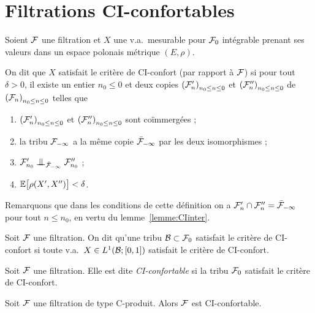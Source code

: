 \documentclass[12pt,a4paper]{article}
\begin{document}
\section{Filtrations CI-confortables}\label{sec:CIconfort}

\begin{definition}\label{def:CIconfort}
Soient $\mathcal{F}$ une filtration et $X$ une v.a.\ mesurable pour $\mathcal{F}_0$ 
intégrable prenant ses valeurs dans un espace polonais métrique $(E,\rho)$. 

On dit que $X$ satisfait le critère de CI-confort (par rapport à $\mathcal{F}$) si pour tout $\delta>0$, 
il existe un entier $n_0 \leq 0$ et deux copies  ${(\mathcal{F}'_n)}_{n_0 \leq n \leq 0}$ et 
${(\mathcal{F}''_n)}_{n_0 \leq n \leq 0}$ de 
${(\mathcal{F}_n)}_{n_0 \leq n \leq 0}$ telles que 
\begin{enumerate}
\item  ${(\mathcal{F}'_n)}_{n_0 \leq n \leq 0}$ et 
${(\mathcal{F}''_n)}_{n_0 \leq n \leq 0}$  sont co\"immergées ;

\item la tribu $\mathcal{F}_{-\infty}$ a la m\^eme copie $\bar{\mathcal{F}}_{-\infty}$ par les 
deux isomorphismes ;

\item $\FF'_{n_0} \indep_{\bar\FF_{-\infty}} \FF''_{n_0}$ ;

\item $\mathbb{E}\bigl[\rho(X', X'')\bigr] < \delta$.
\end{enumerate}
\end{definition}

Remarquons que dans les conditions de cette définition on 
a $\mathcal{F}'_{n}\cap\mathcal{F}''_{n} = \bar{\mathcal{F}}_{-\infty}$ pour tout $n \leq n_0$, en vertu du lemme~\ref{lemme:CIinter}.

\begin{definition}
Soit $\mathcal{F}$ une filtration. On dit qu'une tribu $\mathcal{B} \subset \mathcal{F}_0$ 
satisfait le critère de CI-confort si 
 toute v.a.\  $X \in L^1(\mathcal{B}; [0,1])$  satisfait le critère de CI-confort. 
\end{definition}

\begin{definition}
Soit $\mathcal{F}$ une filtration. Elle est dite \emph{CI-confortable} si 
la tribu $\mathcal{F}_0$  satisfait le critère de CI-confort. 
\end{definition}


\begin{ppsition}\label{ppsition:CproduitCIconfortable}
Soit $\mathcal{F}$ une filtration de type C-produit. Alors $\mathcal{F}$ est CI-confortable.
\end{ppsition}
\end{document}
